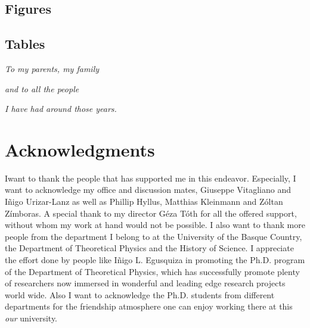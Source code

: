 \documentclass[12pt, letterpaper, twoside]{article}
\numberwithin{equation}{section}
\numberwithin{figure}{section}
\numberwithin{table}{section}
\begin{document}
\makeatletter
\newcommand\listoffigurename{Figures}
\newcommand\listoftablename{Tables}
\renewcommand\listoffigures{
  \subsection*{\listoffigurename}
  \@starttoc{lof}
}
\renewcommand\listoftables{
  \subsection*{\listoftablename}
}
\makeatother
\listoffigures
\listoftables


\cleardoublepage

\fancyfoot{}

\cleardoublepage
\setcounter{page}{1}

\vspace*{100pt}
\begin{center}
\emph{To my parents, my family}

\emph{and to all the people}

\emph{I have had around those years.}
\end{center}

\cleardoublepage

\fancyfoot[LE,RO]{\thepage}
\section*{Acknowledgments}

\lettrine[lines=2, findent=3pt,nindent=0pt]{I}{}want to thank the people that has supported me in this endeavor.
Especially, I want to acknowledge my office and discussion mates, Giuseppe Vitagliano and I\~nigo Urizar-Lanz as well as Phillip Hyllus, Matthias Kleinmann and Z\'oltan Z\'imboras.
A special thank to my director G\'eza T\'oth for all the offered support, without whom my work at hand would not be possible.
I also want to thank more people from the department I belong to at the University of the Basque Country, the Department of Theoretical Physics and the History of Science.
I appreciate the effort done by people like I\~nigo L. Egusquiza in promoting the Ph.D. program of the Department of Theoretical Physics, which has successfully promote plenty of researchers now immersed in wonderful and leading edge research projects world wide.
Also I want to acknowledge the Ph.D. students from different departments for the friendship atmosphere one can enjoy working there at this \emph{our} university.
\end{document}
